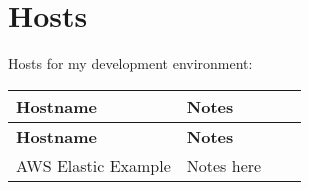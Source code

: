 \chapter{Hosts}

Hosts for my development environment:

\begin{longtable}{p{} p{} p{} p{}}
\toprule
\textbf{Hostname} & \textbf{Notes} \\
\midrule
\endfirsthead
\toprule
\textbf{Hostname} & \textbf{Notes} \\
\midrule
\endhead

AWS Elastic Example & Notes here \\

\bottomrule
\end{longtable}
